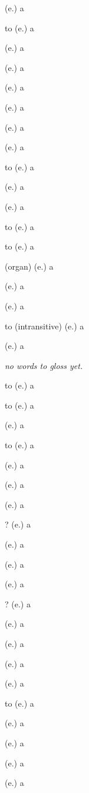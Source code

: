 \begin{glosses}
\par {} (e.) {a}
\par to  (e.) {a}
\par {} (e.) {a}
\par {} (e.) {a}
\par {} (e.) {a}
\par {} (e.) {a}
\par {} (e.) {a}
\par {} (e.) {a}
\par to  (e.) {a}
\par {} (e.) {a}
\par {} (e.) {a}
\par to  (e.) {a}
\par to  (e.) {a}
\par {} (organ) (e.) {a}
\par {} (e.) {a}
\par {} (e.) {a}
\par to  (intransitive) (e.) {a}
\par {} (e.) {a}
\end{glosses}

\begin{glosses}
\par \textit{no words to gloss yet.}
\end{glosses}

\begin{glosses}
\par to  (e.) {a}
\end{glosses}

\begin{glosses}
\par to  (e.) {a}
\par {} (e.) {a}
\par to  (e.) {a}
\par {} (e.) {a}
\par {} (e.) {a}
\par {} (e.) {a}
\par {}? (e.) {a}
\par {} (e.) {a}
\par {} (e.) {a}
\par {} (e.) {a}
\par {}? (e.) {a}
\par {} (e.) {a}
\par {} (e.) {a}
\par {} (e.) {a}
\par {} (e.) {a}
\par to  (e.) {a}
\par {} (e.) {a}
\par {} (e.) {a}
\par {} (e.) {a}
\par {} (e.) {a}
\end{glosses}

